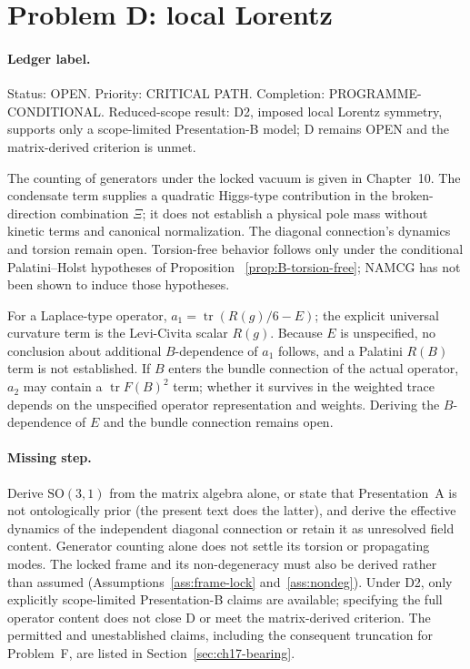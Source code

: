\section{Problem D: local Lorentz}
\label{sec:status-D}

\paragraph{Ledger label.}
Status: OPEN. Priority: CRITICAL PATH. Completion:
PROGRAMME-CONDITIONAL. Reduced-scope result: D2, imposed local
Lorentz symmetry, supports only a scope-limited Presentation-B
model; D remains OPEN and the matrix-derived criterion is unmet.

The counting of generators under the locked vacuum is given in
Chapter~10. The condensate term supplies a quadratic Higgs-type
contribution in the broken-direction combination \(\Xi\); it does not
establish a physical pole mass without kinetic terms and canonical
normalization. The diagonal connection's dynamics and torsion remain
open. Torsion-free behavior follows only under the conditional
Palatini--Holst hypotheses of Proposition~
\ref{prop:B-torsion-free}; NAMCG has not been shown to induce those
hypotheses.

For a Laplace-type operator,
\(a_1=\operatorname{tr}(R(g)/6-E)\); the explicit universal
curvature term is the Levi-Civita scalar \(R(g)\). Because \(E\) is
unspecified, no conclusion about additional \(B\)-dependence of
\(a_1\) follows, and a Palatini \(R(B)\) term is not established. If
\(B\) enters the bundle connection of the actual operator, \(a_2\)
may contain a \(\operatorname{tr}F(B)^2\) term; whether it survives
in the weighted trace depends on the unspecified operator
representation and weights. Deriving the \(B\)-dependence of \(E\)
and the bundle connection remains open.

\paragraph{Missing step.}
Derive \(\mathrm{SO}(3,1)\) from the matrix algebra alone, or state
that Presentation~A is not ontologically prior (the present text
does the latter), and derive the effective dynamics of the
independent diagonal connection or retain it as unresolved field
content. Generator counting alone does not settle its torsion or
propagating modes. The locked frame and its non-degeneracy must also be derived rather
than assumed (Assumptions~\ref{ass:frame-lock} and~\ref{ass:nondeg}).
Under D2, only explicitly scope-limited
Presentation-B claims are available; specifying the full operator
content does not close D or meet the matrix-derived criterion. The
permitted and unestablished claims, including the consequent
truncation for Problem~F, are listed in
Section~\ref{sec:ch17-bearing}.

